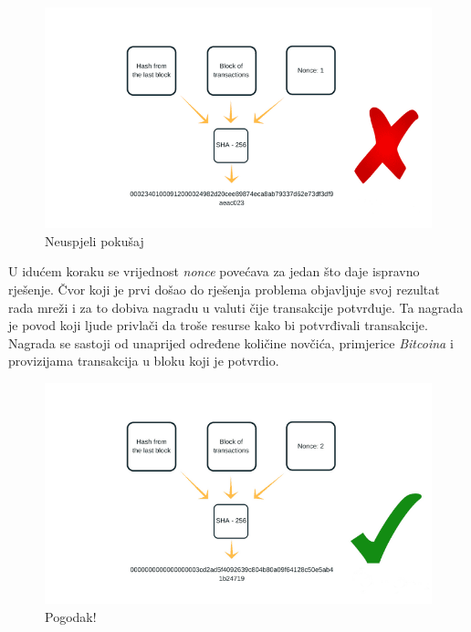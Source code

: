 \documentclass[times, utf8, zavrsni]{fer}
\begin{document}
\begin{figure}[ht]
  \includegraphics[width=\textwidth]{proof-of-work-wrong-result-2.png}
  \caption{Neuspjeli pokušaj}
  \centering
\end{figure}

U idućem koraku se vrijednost \emph{nonce} povećava za jedan što daje ispravno rješenje. Čvor koji je prvi došao do rješenja problema objavljuje svoj rezultat rada mreži
i za to dobiva nagradu u valuti čije transakcije potvrđuje. Ta nagrada je povod koji ljude privlači da troše resurse kako bi potvrđivali transakcije. Nagrada se sastoji
od unaprijed određene količine novčića, primjerice \emph{Bitcoina} i provizijama transakcija u bloku koji je potvrdio. 

\begin{figure}[ht]
  \includegraphics[width=\textwidth]{proof-of-work-right-result-2.png}
  \caption{Pogodak!}
  \centering
\end{figure}
\end{document}
